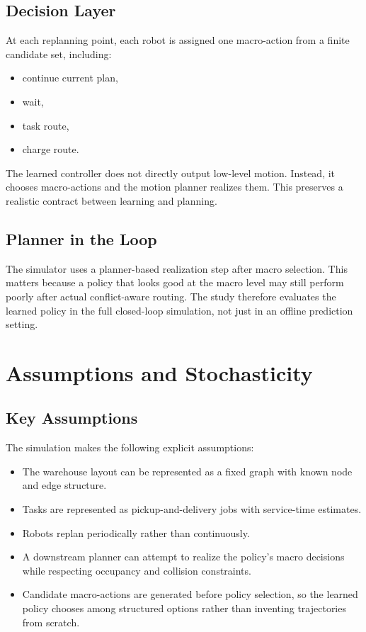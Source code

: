 \documentclass[11pt]{article}
\begin{document}
\subsection{Decision Layer}
At each replanning point, each robot is assigned one macro-action from a finite candidate set, including:
\begin{itemize}[leftmargin=1.5em]
    \item continue current plan,
    \item wait,
    \item task route,
    \item charge route.
\end{itemize}

The learned controller does not directly output low-level motion. Instead, it chooses macro-actions and the motion planner realizes them. This preserves a realistic contract between learning and planning.

\subsection{Planner in the Loop}
The simulator uses a planner-based realization step after macro selection. This matters because a policy that looks good at the macro level may still perform poorly after actual conflict-aware routing. The study therefore evaluates the learned policy in the full closed-loop simulation, not just in an offline prediction setting.

\section{Assumptions and Stochasticity}
\subsection{Key Assumptions}
The simulation makes the following explicit assumptions:
\begin{itemize}[leftmargin=1.5em]
    \item The warehouse layout can be represented as a fixed graph with known node and edge structure.
    \item Tasks are represented as pickup-and-delivery jobs with service-time estimates.
    \item Robots replan periodically rather than continuously.
    \item A downstream planner can attempt to realize the policy's macro decisions while respecting occupancy and collision constraints.
    \item Candidate macro-actions are generated before policy selection, so the learned policy chooses among structured options rather than inventing trajectories from scratch.
\end{itemize}
\end{document}
